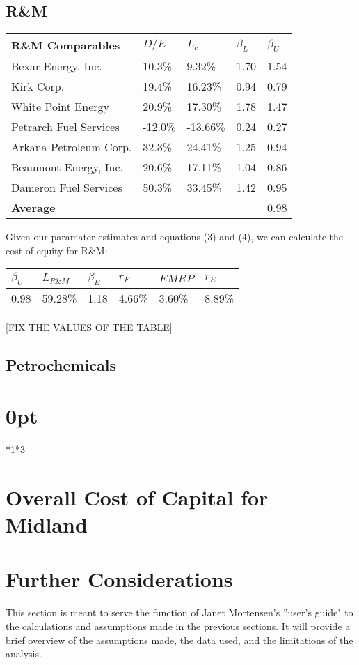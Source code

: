 \documentclass{article}
\begin{document}
\subsection{R\&M}
\begin{table}[h]
    \centering
    \begin{tabular}{lllll}
        \hline
    \textbf{R\&M Comparables}   & $D/E$   & $L_c$    & $\beta_L$ & $\beta_U$ \\\hline
    Bexar Energy, Inc.     & 10.3\%  & 9.32\%   & 1.70      & 1.54      \\
    Kirk Corp.             & 19.4\%  & 16.23\%  & 0.94      & 0.79      \\
    White Point Energy     & 20.9\%  & 17.30\%  & 1.78      & 1.47      \\
    Petrarch Fuel Services & -12.0\% & -13.66\% & 0.24      & 0.27      \\
    Arkana Petroleum Corp. & 32.3\%  & 24.41\%  & 1.25      & 0.94      \\
    Beaumont Energy, Inc.  & 20.6\%  & 17.11\%  & 1.04      & 0.86      \\
    Dameron Fuel Services  & 50.3\%  & 33.45\%  & 1.42      & 0.95 \\ \hline
    \textbf{Average}        &         &          &           & 0.98
    \end{tabular}
    \end{table}
Given our paramater estimates and equations (3) and (4), we can calculate the cost of equity for R\&M:
\begin{table}[h]
    \centering
    \begin{tabular}{llllll}
            \hline
        $\beta_U$ & $L_{R\&M}$ & $\beta_E$ & $r_F$  & $EMRP$ & $r_E$  \\\hline
        0.98      & 59.28\% & 1.18      & 4.66\% & 3.60\% & 8.89\%
    \end{tabular}
    \end{table}
   [FIX THE VALUES OF THE TABLE] 
\subsection{Petrochemicals}

\titlespacing\section{0pt}{*1}{*3}
\hrulefill
\section{Overall Cost of Capital for Midland}

\hrulefill
\section{Further Considerations}
This section is meant to serve the function of Janet Mortensen's ''user's guide" to the calculations and assumptions made in the previous sections. It will provide a brief overview of the assumptions made, the data used, and the limitations of the analysis.
\end{document}
